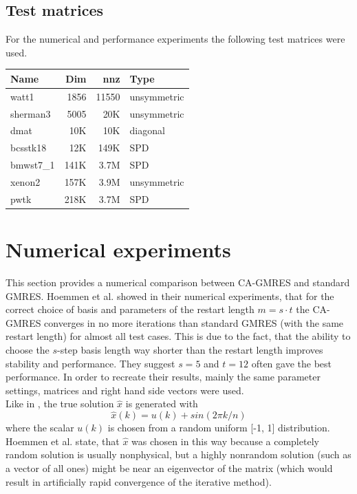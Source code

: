 \documentclass{scrartcl}
\numberwithin{equation}{section}
\begin{document}
\subsection{Test matrices}
For the numerical and performance experiments the following test matrices were used.
\begin{center}
\begin{tabular}{l|r|r|l}
Name & Dim & nnz & Type\\
\hline
watt1 & 1856 & 11550 & unsymmetric\\
sherman3 & 5005 & 20K & unsymmetric\\
dmat & 10K & 10K & diagonal\\
bcsstk18 & 12K & 149K & SPD\\
bmwst7\_1 & 141K & 3.7M & SPD\\
xenon2 & 157K & 3.9M & unsymmetric\\
pwtk & 218K & 3.7M & SPD
\end{tabular}
\end{center}

\section{Numerical experiments}\label{sec:Numerical_experiments}
This section provides a numerical comparison between CA-GMRES and standard GMRES. Hoemmen et al. \cite{Hoemmen:2010:CKS:1970638} showed in their numerical experiments, that for the correct choice of basis and parameters of the restart length $m = s \cdot t$ the CA-GMRES converges in no more iterations than standard GMRES (with the same restart length) for almost all test cases. This is due to the fact, that the ability to choose the $s$-step basis length way shorter than the restart length improves stability and performance. They suggest $s = 5$ and $t = 12$ often gave the best performance. In order to recreate their results, mainly the same parameter settings, matrices and right hand side vectors were used.\\

Like in \cite{Hoemmen:2010:CKS:1970638}, the true solution $\hat{x}$ is generated with
\begin{equation}
	\hat{x}(k) = u(k) + sin(2\pi k/n)
\end{equation}
where the scalar $u(k)$ is chosen from a random uniform [-1, 1] distribution. 
Hoemmen et al. state, that $\hat{x}$ was chosen in this way because a completely random solution is usually nonphysical, but a highly nonrandom solution (such as a vector of all ones) might be near an eigenvector of the matrix (which would result in artificially rapid convergence of the iterative method).
\end{document}
